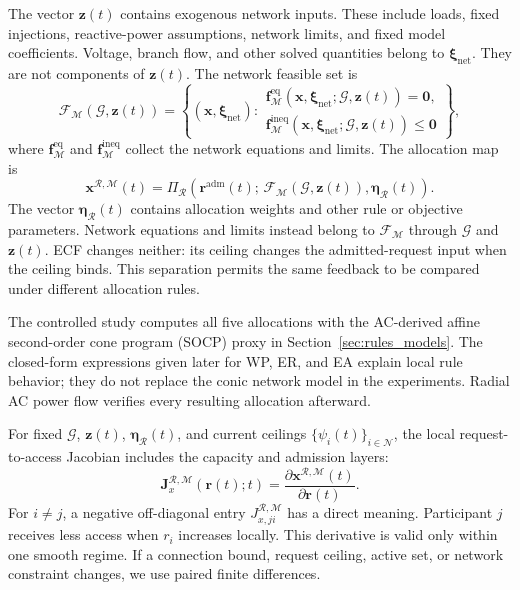 \documentclass[twoside,twocolumn,9pt]{article}
\begin{document}
{The vector $\mathbf z(t)$ contains exogenous network inputs. These include
loads, fixed injections, reactive-power assumptions, network limits, and fixed
model coefficients. Voltage, branch flow, and other solved quantities belong to
$\boldsymbol\xi_{\mathrm{net}}$. They are not components of $\mathbf z(t)$. The
network feasible set is
\begin{equation}
\mathcal F_{\mathcal M}(\mathcal G,\mathbf z(t))
=
\left\{(\mathbf x,\boldsymbol\xi_{\mathrm{net}}):
\begin{array}{l}
\mathbf f_{\mathcal M}^{\mathrm{eq}}(\mathbf x,\boldsymbol\xi_{\mathrm{net}};\mathcal G,\mathbf z(t))=\mathbf{0},\\[1mm]
\mathbf f_{\mathcal M}^{\mathrm{ineq}}(\mathbf x,\boldsymbol\xi_{\mathrm{net}};\mathcal G,\mathbf z(t))\le\mathbf{0}
\end{array}
\right\},
\label{eq:network_feasible_set}
\end{equation}
where $\mathbf f_{\mathcal M}^{\mathrm{eq}}$ and
$\mathbf f_{\mathcal M}^{\mathrm{ineq}}$ collect the network equations and
limits. The allocation map is
\begin{equation}
\mathbf x^{\mathcal R,\mathcal M}(t)
=
\Pi_{\mathcal R}\!\left(
\mathbf r^{\mathrm{adm}}(t);\,
\mathcal F_{\mathcal M}(\mathcal G,\mathbf z(t)),
\boldsymbol\eta_{\mathcal R}(t)
\right).
\label{eq:general_allocation_map}
\end{equation}
The vector $\boldsymbol\eta_{\mathcal R}(t)$ contains allocation weights and
other rule or objective parameters. Network equations and limits instead belong
to $\mathcal F_{\mathcal M}$ through $\mathcal G$ and $\mathbf z(t)$.
ECF changes neither: its ceiling changes the admitted-request input when the
ceiling binds. This separation permits the same feedback to be compared under
different allocation rules.

The controlled study computes all five allocations with the AC-derived affine
second-order cone program (SOCP) proxy in
Section~\ref{sec:rules_models}. The closed-form expressions given later for WP,
ER, and EA explain local rule behavior; they do not replace the conic network
model in the experiments. Radial AC power flow verifies every resulting
allocation afterward.

For fixed $\mathcal G$, $\mathbf z(t)$,
$\boldsymbol\eta_{\mathcal R}(t)$, and current ceilings
$\{\psi_i(t)\}_{i\in\mathcal N}$, the local request-to-access Jacobian includes
the capacity and admission layers:
\begin{equation}
\mathbf J_x^{\mathcal R,\mathcal M}(\mathbf r(t);t)
=
\frac{\partial\mathbf x^{\mathcal R,\mathcal M}(t)}
{\partial\mathbf r(t)}.
\label{eq:access_sensitivity}
\end{equation}
For $i\ne j$, a negative off-diagonal entry
$J_{x,ji}^{\mathcal R,\mathcal M}$ has a direct meaning. Participant $j$
receives less access when $r_i$ increases locally. This derivative is valid only within one
smooth regime. If a connection bound, request ceiling, active set, or network
constraint changes, we use paired finite differences.

}
\end{document}
